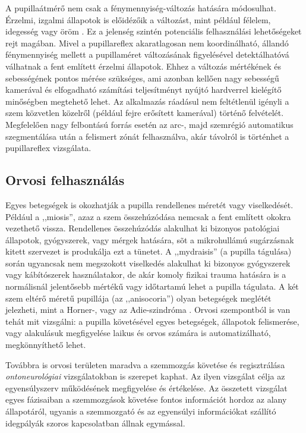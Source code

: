 A pupillaátmérő nem csak a fénymennyiség-változás hatására módosulhat. Érzelmi, izgalmi állapotok is előidézőik a változást, mint például félelem, idegesség vagy öröm \cite{altpszicho}. Ez a jelenség szintén potenciális felhasználási lehetőségeket rejt magában. Mivel a pupillareflex akaratlagosan nem koordinálható, állandó fénymennyiség mellett a pupillaméret változásának figyelésével detektálhatóvá válhatnak a fent említett érzelmi állapotok. Ehhez a változás mértékének és sebességének pontos mérése szükséges, ami azonban kellően nagy sebességű kamerával és elfogadható számítási teljesítményt nyújtó hardverrel kielégítő minőségben megtehető lehet. Az alkalmazás ráadásul nem feltétlenül igényli a szem közvetlen közelről (például fejre erősített kamerával) történő felvételét. Megfelelően nagy felbontású forrás esetén az arc-, majd szemrégió automatikus szegmentálása után a felismert zónát felhasználva, akár távolról is történhet a pupillareflex vizsgálata.

\subsection{Orvosi felhasználás}\label{sect:orvosi_felh}

Egyes betegségek is okozhatják a pupilla rendellenes méretét vagy viselkedését. Például a ,,miosis'', azaz a szem összehúzódása nemcsak a fent említett okokra vezethető vissza. Rendellenes összehúzódás alakulhat ki bizonyos patológiai állapotok, gyógyszerek, vagy mérgek hatására, sõt a mikrohullámú sugárzásnak kitett szervezet is produkálja ezt a tünetet. A ,,mydraisis'' (a pupilla tágulása) során ugyancsak nem megszokott viselkedés alakulhat ki bizonyos gyógyszerek vagy kábítószerek használatakor, de akár komoly fizikai trauma hatására is a normálisnál jelentősebb mértékű vagy időtartamú lehet a pupilla tágulata. A két szem eltérő méretű pupillája (az ,,anisocoria'') olyan betegségek meglétét jelezheti, mint a Horner-, vagy az Adie-szindróma \cite{altpszicho}. Orvosi szempontból is van tehát mit vizsgálni: a pupilla követésével egyes betegségek, állapotok felismerése, vagy alakulásuk megfigyelése laikus és orvos számára is automatizálható, megkönnyíthető lehet.

\bigskip

Továbbra is orvosi területen maradva a szemmozgás követése és regisztrálása \emph{ontoneurológiai} vizsgálatokban is szerepet kaphat. Az ilyen vizsgálat célja az egyensúlyszerv működésének megfigyelése és értékelése. Az összetett vizsgálat egyes fázisaiban a szemmozgások követése fontos információt hordoz az alany állapotáról, ugyanis a szemmozgató és az egyensúlyi információkat szállító idegpályák szoros kapcsolatban állnak egymással.

